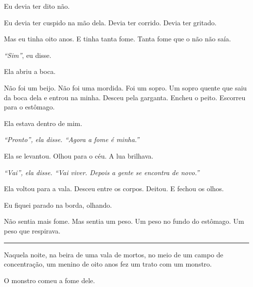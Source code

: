 \noindent Eu devia ter dito não.

\noindent Eu devia ter cuspido na mão dela. Devia ter corrido. Devia ter gritado.

\noindent Mas eu tinha oito anos.
E tinha tanta fome.
Tanta fome que o não não saía.

\noindent \textit{\textquotedblleft{}Sim\textquotedblright{}}, eu disse.

\noindent Ela abriu a boca.

\noindent Não foi um beijo. Não foi uma mordida. Foi um sopro. Um sopro quente que saiu da boca dela e entrou na minha. Desceu pela garganta. Encheu o peito. Escorreu para o estômago.

\noindent Ela estava dentro de mim.

\noindent \textit{\textquotedblleft{}Pronto\textquotedblright{}\textit{, ela disse. }\textquotedblleft{}Agora a fome é minha.\textquotedblright{}}

\noindent Ela se levantou. Olhou para o céu. A lua brilhava.

\noindent \textit{\textquotedblleft{}Vai\textquotedblright{}\textit{, ela disse. } \textquotedblleft{}Vai viver. Depois a gente se encontra de novo.\textquotedblright{}}

\noindent Ela voltou para a vala. Desceu entre os corpos. Deitou. E fechou os olhos.

\noindent Eu fiquei parado na borda, olhando.

\noindent Não sentia mais fome.
Mas sentia um peso.
Um peso no fundo do estômago.
Um peso que respirava.

\vspace{0.5em}\noindent\rule{\textwidth}{0.5pt}\vspace{0.5em}

\noindent Naquela noite, na beira de uma vala de mortos, no meio de um campo de concentração, um menino de oito anos fez um trato com um monstro.

\noindent O monstro comeu a fome dele.

